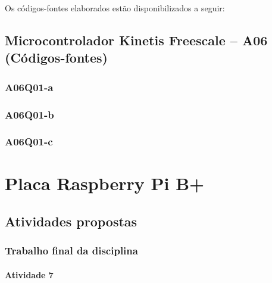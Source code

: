 \documentclass[
	12pt,				%
	openright,			%
  oneside,     %
	a4paper,			%
	english,			%
	french,				%
	spanish,			%
	brazil				%
	]{abntex2}
\begin{document}
\newpage
Os códigos-fontes elaborados estão disponibilizados a seguir:
\section*{Microcontrolador Kinetis Freescale -- A06 (Códigos-fontes)}
\label{sec:Kinetis-Freescale-A06Q01-a}
\subsection*{A06Q01-a}


\subsection*{A06Q01-b}


\subsection*{A06Q01-c}




%
%

\chapter{Placa Raspberry Pi B+} %
\label{cha:7-placa_raspberry_pi}

\section{Atividades propostas} %
\label{sec:RaspberryPi-atividades_propostas}

\subsection*{Trabalho final da disciplina}

\subsubsection*{Atividade 7}
\end{document}
